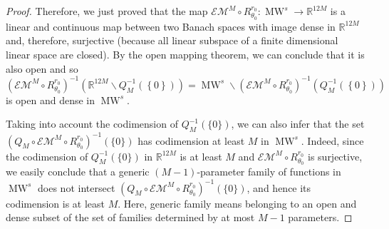 \documentclass{amsart}
\theoremstyle{definition}
\theoremstyle{remark}
\numberwithin{equation}{section}
\theoremstyle{definition}
\theoremstyle{remark}
\DeclareMathOperator\MW{MW}
\begin{document}
\begin{proof}
    Therefore, we just proved that the map $\mathcal{EM}^M\circ R_{\theta_0}^{r_0}:\MW^s\rightarrow\mathbb{R}^{12M}$ is a linear and continuous map between two Banach spaces with image dense in $\mathbb{R}^{12M}$ and, therefore, surjective (because all linear subspace of a finite dimensional linear space are closed).  By the open mapping theorem, we can conclude that it is also open and so $\left(\mathcal{EM}^M\circ R_{\theta_0}^{r_0}\right)^{-1}\left(\mathbb{R}^{12M}\backslash Q_M^{-1}\left(\left\{0\right\}\right)\right)=\MW^s\backslash\left(\mathcal{EM}^M\circ R_{\theta_0}^{r_0}\right)^{-1}\left( Q_M^{-1}\left(\left\{0\right\}\right)\right)$ is open and dense in $\MW^s$. 
    
    Taking into account the codimension of $Q_M^{-1}\left(\{0\}\right)$, we can also infer that the set $\left(Q_M\circ\mathcal{EM}^M\circ R_{\theta_0}^{r_0}\right)^{-1}\left(\{0\}\right)$ has codimension at least $M$ in $\MW^s$. Indeed, since the codimension of $Q_M^{-1}\left(\{0\}\right)$ in $\mathbb{R}^{12M}$ is at least $M$ and $\mathcal{EM}^M\circ R^{r_0}_{\theta_0}$ is surjective, we easily conclude that a generic $(M-1)$-parameter family of functions in $\MW^s$ does not intersect $\left(Q_M\circ\mathcal{EM}^M\circ R^{r_0}_{\theta_0}\right)^{-1}\left(\{0\}\right)$, and hence its codimension is at least $M$. Here, generic family means belonging to an open and dense subset of the set of families determined by at most $M-1$ parameters.
	

\end{proof}
\end{document}
